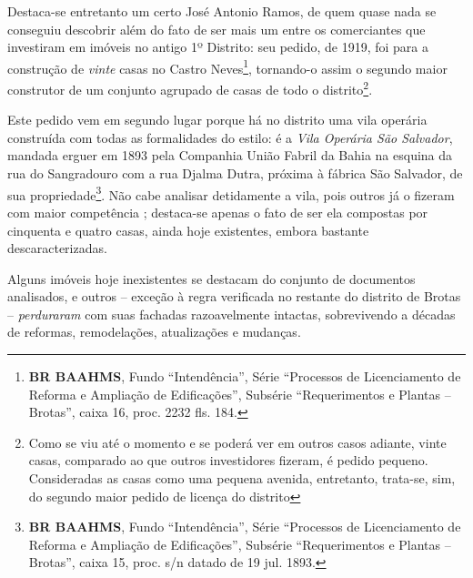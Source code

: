 Destaca-se entretanto um certo José Antonio Ramos, de quem quase nada se conseguiu descobrir além do fato de ser mais um entre os comerciantes que investiram em imóveis no antigo 1º Distrito: seu pedido, de 1919, foi para a construção de \textit{vinte} casas no Castro Neves\footnote{\textbf{BR BAAHMS}, Fundo ``Intendência'', Série ``Processos de Licenciamento de Reforma e Ampliação de Edificações'', Subsérie ``Requerimentos e Plantas -- Brotas'', caixa 16, proc. 2232 fls. 184.}, tornando-o assim o segundo maior construtor de um conjunto agrupado de casas de todo o distrito\footnote{Como se viu até o momento e se poderá ver em outros casos adiante, vinte casas, comparado ao que outros investidores fizeram, é pedido pequeno. Consideradas as casas como uma pequena avenida, entretanto, trata-se, sim, do segundo maior pedido de licença do distrito}. 

Este pedido vem em segundo lugar porque há no distrito uma vila operária construída com todas as formalidades do estilo: é a \textit{Vila Operária São Salvador}, mandada erguer em 1893 pela Companhia União Fabril da Bahia na esquina da rua do Sangradouro com a rua Djalma Dutra, próxima à fábrica São Salvador, de sua propriedade\footnote{\textbf{BR BAAHMS}, Fundo ``Intendência'', Série ``Processos de Licenciamento de Reforma e Ampliação de Edificações'', Subsérie ``Requerimentos e Plantas -- Brotas'', caixa 15, proc. s/n datado de 19 jul. 1893.}. Não cabe analisar detidamente a vila, pois outros já o fizeram com maior competência \cite{cardoso1990proleta, cardoso_vilas_1991}; destaca-se apenas o fato de ser ela compostas por cinquenta e quatro casas, ainda hoje existentes, embora bastante descaracterizadas.


Alguns imóveis hoje inexistentes se destacam do conjunto de documentos analisados, e outros -- exceção à regra verificada no restante do distrito de Brotas -- \textit{perduraram} com suas fachadas razoavelmente intactas, sobrevivendo a décadas de reformas, remodelações, atualizações e mudanças.

